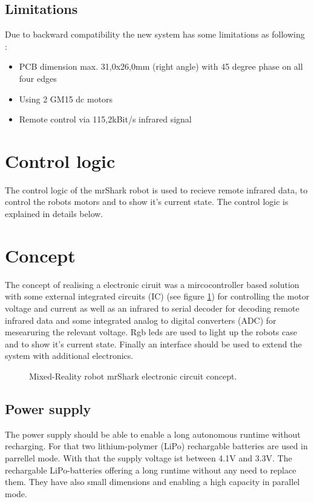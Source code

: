 \documentclass{acm_proc_article-sp}
\begin{document}
\subsection{Limitations}
Due to backward compatibility the new system has some limitations as following
\cite{eilers:13}:
\begin{itemize}
  \item PCB dimension max. 31,0x26,0mm (right angle) with 45 degree phase on
  all four edges
  \item Using 2 GM15 dc motors
  \item Remote control via 115,2kBit/s infrared signal
 \end{itemize}

\section{Control logic}
The control logic of the mrShark robot is used to recieve remote infrared data,
to control the robots motors and to show it's current state. The control logic
is explained in details below.

\section{Concept}
The concept of realising a electronic ciruit was a mircocontroller based
solution with some external integrated circuits (IC) (see figure \ref{fig:concept}) for
controlling the motor voltage and current as well as an infrared to serial
decoder for decoding remote infrared data and some integrated analog to digital
converters (ADC) for mesearuring the relevant voltage. Rgb leds are used to
light up the robots case and to show it's current state. Finally an
interface should be used to extend the system with additional electronics.

\begin{figure}
\centering
{}
\caption{Mixed-Reality robot mrShark electronic circuit concept.}
\label{fig:concept}
\end{figure}

\subsection{Power supply}
The power supply should be able to enable a long autonomous runtime without
recharging. For that two lithium-polymer (LiPo) rechargable batteries are used
in parrellel mode. With that the supply voltage ist between 4.1V and 3.3V\cite{eilers:13}.
The rechargable LiPo-batteries offering a long runtime without any need to replace
them. They have also small dimensions and enabling a high capacity in parallel mode.
\end{document}
